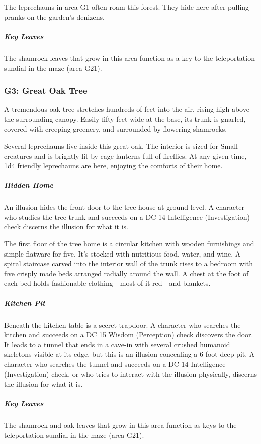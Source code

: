 \documentclass[10pt,a4paper,twoside,bg=print,twocolumn,openany,nodeprecatedcode]{dndbook}
\begin{document}
The leprechauns in area G1 often roam this forest. They hide here after pulling pranks on the garden's denizens.

\subparagraph{Key Leaves}
The shamrock leaves that grow in this area function as a key to the teleportation sundial in the maze (area G21).

\subsubsection{G3: Great Oak Tree}
\begin{DndReadAloud}{}
A tremendous oak tree stretches hundreds of feet into the air, rising high above the surrounding canopy. Easily fifty feet wide at the base, its trunk is gnarled, covered with creeping greenery, and surrounded by flowering shamrocks.

\end{DndReadAloud}

Several leprechauns live inside this great oak. The interior is sized for Small creatures and is brightly lit by cage lanterns full of fireflies. At any given time, 1d4 friendly leprechauns are here, enjoying the comforts of their home.

\subparagraph{Hidden Home}
An illusion hides the front door to the tree house at ground level. A character who studies the tree trunk and succeeds on a DC 14 Intelligence (Investigation) check discerns the illusion for what it is.

The first floor of the tree home is a circular kitchen with wooden furnishings and simple flatware for five. It's stocked with nutritious food, water, and wine. A spiral staircase carved into the interior wall of the trunk rises to a bedroom with five crisply made beds arranged radially around the wall. A chest at the foot of each bed holds fashionable clothing—most of it red—and blankets.

\subparagraph{Kitchen Pit}
Beneath the kitchen table is a secret trapdoor. A character who searches the kitchen and succeeds on a DC 15 Wisdom (Perception) check discovers the door. It leads to a tunnel that ends in a cave-in with several crushed humanoid skeletons visible at its edge, but this is an illusion concealing a 6-foot-deep pit. A character who searches the tunnel and succeeds on a DC 14 Intelligence (Investigation) check, or who tries to interact with the illusion physically, discerns the illusion for what it is.

\subparagraph{Key Leaves}
The shamrock and oak leaves that grow in this area function as keys to the teleportation sundial in the maze (area G21).
\end{document}
